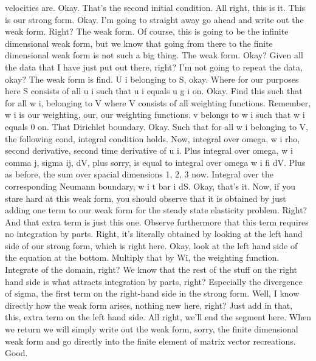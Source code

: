 \documentclass[10pt]{article}
\begin{document}
velocities are. Okay. That's the second initial condition. All right, this is it. This is our strong form. Okay. I'm going to straight away go ahead and write out the weak form. Right? The weak form. Of course, this is going to be the infinite dimensional weak form, but we know that going from there to the finite dimensional weak form is not such a big thing. The weak form. Okay? Given all the data that I have just put out there, right? I'm not going to repeat the data, okay? The weak form is find. U i belonging to S, okay. Where for our purposes here S consists of all u i such that u i equals u g i on. Okay. Find this such that for all w i, belonging to V where V consists of all weighting functions. Remember, w i is our weighting, our, our weighting functions. v belongs to w i such that w i equals 0 on. That Dirichlet boundary. Okay. Such that for all w i belonging to V, the following cond, integral condition holds. Now, integral over omega, w i rho, second derivative, second time derivative of u i. Plus integral over omega, w i comma j, sigma ij, dV, plus sorry, is equal to integral over omega w i fi dV. Plus as before, the sum over spacial dimensions 1, 2, 3 now. Integral over the corresponding Neumann boundary, w i t bar i dS. Okay, that's it. Now, if you stare hard at this weak form, you should observe that it is obtained by just adding one term to our weak form for the steady state elasticity problem. Right? And that extra term is just this one. Observe furthermore that this term requires no integration by parts. Right, it's literally obtained by looking at the left hand side of our strong form, which is right here. Okay, look at the left hand side of the equation at the bottom. Multiply that by Wi, the weighting function. Integrate of the domain, right? We know that the rest of the stuff on the right hand side is what attracts integration by parts, right? Especially the divergence of sigma, the first term on the right-hand side in the strong form. Well, I know directly how the weak form arises, nothing new here, right? Just add in that, this, extra term on the left hand side. All right, we'll end the segment here. When we return we will simply write out the weak form, sorry, the finite dimensional weak form and go directly into the finite element of matrix vector recreations. Good.
\end{document}
